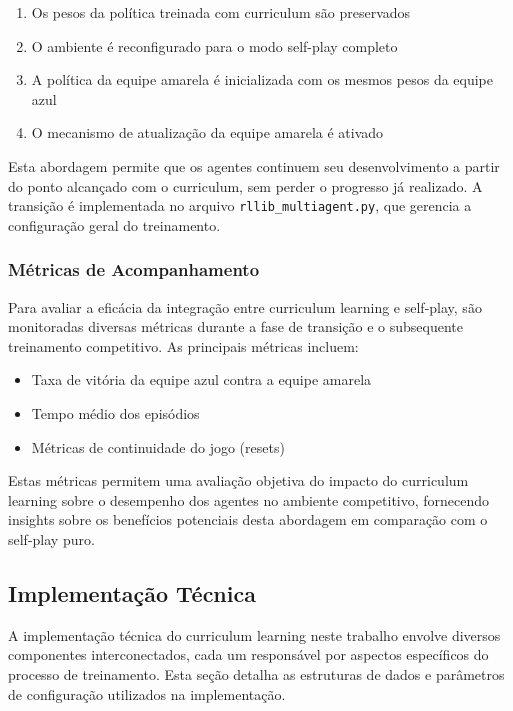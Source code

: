 \begin{enumerate}
    \item Os pesos da política treinada com curriculum são preservados
    \item O ambiente é reconfigurado para o modo self-play completo
    \item A política da equipe amarela é inicializada com os mesmos pesos da equipe azul
    \item O mecanismo de atualização da equipe amarela é ativado
\end{enumerate}

Esta abordagem permite que os agentes continuem seu desenvolvimento a partir do ponto alcançado com o curriculum, sem perder o progresso já realizado. A transição é implementada no arquivo \texttt{rllib\_multiagent.py}, que gerencia a configuração geral do treinamento.

\subsubsection{Métricas de Acompanhamento}

Para avaliar a eficácia da integração entre curriculum learning e self-play, são monitoradas diversas métricas durante a fase de transição e o subsequente treinamento competitivo. As principais métricas incluem:

\begin{itemize}
    \item Taxa de vitória da equipe azul contra a equipe amarela
    \item Tempo médio dos episódios
    \item Métricas de continuidade do jogo (resets)
\end{itemize}

Estas métricas permitem uma avaliação objetiva do impacto do curriculum learning sobre o desempenho dos agentes no ambiente competitivo, fornecendo insights sobre os benefícios potenciais desta abordagem em comparação com o self-play puro.

\subsection{Implementação Técnica}
\label{subsec:implementacao_tecnica}

A implementação técnica do curriculum learning neste trabalho envolve diversos componentes interconectados, cada um responsável por aspectos específicos do processo de treinamento. Esta seção detalha as estruturas de dados e parâmetros de configuração utilizados na implementação.

